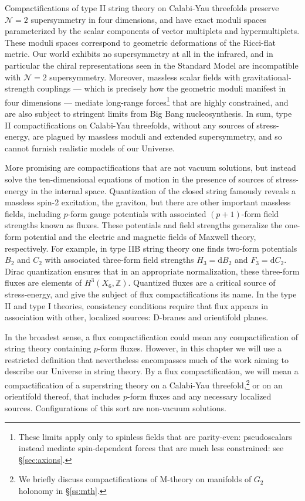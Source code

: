 \documentclass[12pt,a4wide]{article}
\def\d{\mathrm{d}}
\begin{document}
Compactifications of type II string theory on Calabi-Yau threefolds preserve $\mathcal{N}=2$ supersymmetry in four dimensions, and have exact moduli spaces parameterized by the scalar components of vector multiplets and hypermultiplets.  These moduli spaces correspond to geometric deformations of the Ricci-flat metric.  Our world exhibits no supersymmetry at all in the infrared, and in particular the chiral representations seen in the Standard Model are incompatible with $\mathcal{N}=2$ supersymmetry.  Moreover, massless scalar fields with gravitational-strength couplings --- which is precisely how the geometric moduli manifest in four dimensions --- mediate long-range forces\footnote{These limits apply only to spinless fields that are parity-even: pseudoscalars instead mediate spin-dependent forces that are much less constrained: see \S\ref{sec:axions}.} that are highly constrained, and are also subject to stringent limits from 
Big Bang nucleosynthesis.  In sum, type II compactifications on Calabi-Yau threefolds, without any sources of stress-energy, are plagued by massless moduli and extended supersymmetry, and so cannot furnish realistic models of our Universe.

More promising are compactifications that are not vacuum solutions, but instead solve the ten-dimensional equations of motion in the presence of sources of stress-energy in the internal space.
Quantization of the closed string famously reveals a massless spin-2 excitation, the graviton, but there are other important massless fields, including $p$-form gauge potentials with associated $(p+1)$-form field strengths known as fluxes.  These potentials and field strengths generalize the one-form potential and the electric and magnetic fields of  Maxwell theory, respectively.
For example, in type IIB string theory one finds two-form potentials $B_2$ and $C_2$ with associated three-form field strengths $H_3 = \d B_2$ and $F_3 = \d C_2$.  Dirac quantization ensures that in an appropriate normalization, these three-form fluxes are elements of $H^3(X_6,\mathbb{Z})$.  Quantized fluxes are a critical source of stress-energy, and give the subject of flux compactifications its name.  
In the type II and type I theories, consistency conditions require that flux appears in association with other, localized sources: D-branes and orientifold planes.

In the broadest sense, a flux compactification could mean any compactification of string theory containing $p$-form fluxes.
However, in this chapter we will use a restricted definition that nevertheless encompasses much of the work aiming to describe our Universe in string theory.   By a flux compactification, we will mean a compactification of a superstring theory on a Calabi-Yau threefold,\footnote{We briefly discuss compactifications of M-theory on manifolds of $G_2$ holonomy in \S\ref{ss:mth}.} or on an orientifold thereof, that includes $p$-form fluxes and any necessary localized sources.
Configurations of this sort are non-vacuum solutions.
\end{document}
